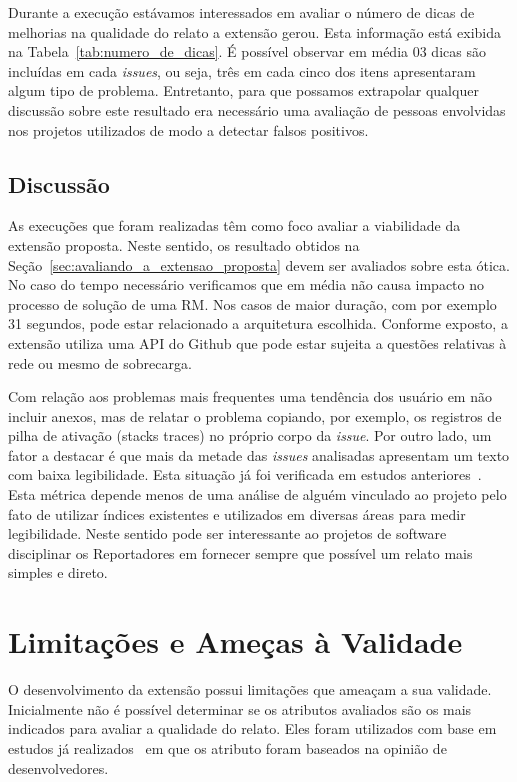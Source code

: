 Durante a execução estávamos interessados em avaliar o número de dicas de
melhorias na qualidade do relato a extensão gerou. Esta informação está exibida
na Tabela~\ref{tab:numero_de_dicas}. É possível observar em média 03 dicas são
incluídas em cada \textit{issues}, ou seja, três em cada cinco dos itens
apresentaram algum tipo de problema. Entretanto, para que possamos extrapolar
qualquer discussão sobre este resultado era necessário uma avaliação de pessoas
envolvidas nos projetos utilizados de modo a detectar falsos positivos.

\subsection{Discussão}
\label{sub:implemtacao_extensao_avaliacao_discussao}

As execuções que foram realizadas têm como foco avaliar a viabilidade da
extensão proposta. Neste sentido, os resultado obtidos na
Seção~\ref{sec:avaliando_a_extensao_proposta} devem ser avaliados sobre esta
ótica. No caso do tempo necessário verificamos que em média não causa impacto no
processo de solução de uma RM\@. Nos casos de maior duração, com por exemplo 31
segundos, pode estar relacionado a arquitetura escolhida. Conforme exposto, a
extensão utiliza uma API do Github que pode estar sujeita a questões relativas à
rede ou mesmo de sobrecarga.

Com relação aos problemas mais frequentes uma tendência dos usuário em não
incluir anexos, mas de relatar o problema copiando, por exemplo, os registros de
pilha de ativação (stacks traces) no próprio corpo da \textit{issue}. Por outro
lado, um fator a destacar é que mais da metade das \textit{issues} analisadas
apresentam um texto com baixa legibilidade. Esta situação já foi verificada em
estudos anteriores~\cite{ko2006linguistic, bettenburg2007quality}. Esta métrica
depende menos de uma análise de alguém vinculado ao projeto pelo fato de
utilizar índices existentes e utilizados em diversas áreas para medir
legibilidade. Neste sentido pode ser interessante ao projetos de software
disciplinar os Reportadores em fornecer sempre que possível um relato mais
simples e direto.

\section{Limitações e Ameças à Validade}
\label{sec:limitações_e_ameças_à_validade}

O desenvolvimento da extensão possui limitações que ameaçam a sua validade.
Inicialmente não é possível determinar se os atributos avaliados são os mais
indicados para avaliar a qualidade do relato. Eles foram utilizados com base em
estudos já realizados~\cite{bettenburg2007quality} em que os atributo foram
baseados na opinião de desenvolvedores.

